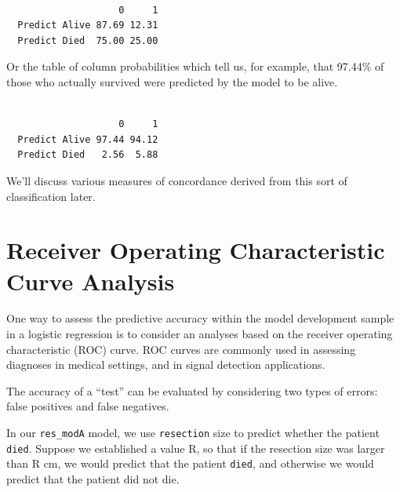 \documentclass[]{book}
\newenvironment{Shaded}{\begin{snugshade}}{\end{snugshade}}
\newcommand{\KeywordTok}[1]{\textcolor[rgb]{0.13,0.29,0.53}{\textbf{#1}}}
\newcommand{\DecValTok}[1]{\textcolor[rgb]{0.00,0.00,0.81}{#1}}
\newcommand{\OperatorTok}[1]{\textcolor[rgb]{0.81,0.36,0.00}{\textbf{#1}}}
\newcommand{\NormalTok}[1]{#1}
\theoremstyle{definition}
\theoremstyle{definition}
\theoremstyle{definition}
\theoremstyle{remark}
\begin{document}
\begin{verbatim}
               
                    0     1
  Predict Alive 87.69 12.31
  Predict Died  75.00 25.00
\end{verbatim}

Or the table of column probabilities which tell us, for example, that
97.44\% of those who actually survived were predicted by the model to be
alive.

\begin{Shaded}
\end{Shaded}

\begin{verbatim}
               
                    0     1
  Predict Alive 97.44 94.12
  Predict Died   2.56  5.88
\end{verbatim}

We'll discuss various measures of concordance derived from this sort of
classification later.

\section{Receiver Operating Characteristic Curve
Analysis}\label{receiver-operating-characteristic-curve-analysis}

One way to assess the predictive accuracy within the model development
sample in a logistic regression is to consider an analyses based on the
receiver operating characteristic (ROC) curve. ROC curves are commonly
used in assessing diagnoses in medical settings, and in signal detection
applications.

The accuracy of a ``test'' can be evaluated by considering two types of
errors: false positives and false negatives.

In our \texttt{res\_modA} model, we use \texttt{resection} size to
predict whether the patient \texttt{died}. Suppose we established a
value R, so that if the resection size was larger than R cm, we would
predict that the patient \texttt{died}, and otherwise we would predict
that the patient did not die.
\end{document}
